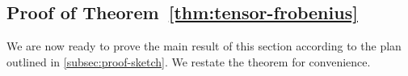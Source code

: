 \documentclass[aos]{imsart}
\theoremstyle{definition}
\numberwithin{equation}{section}
\DeclareMathOperator{\op}{op}
\DeclarePairedDelimiter{\abs}{\lvert}{\rvert}
\DeclarePairedDelimiter{\norm}{\lVert}{\rVert}
\def\dmax{d_{\max}}
\begin{document}

\subsection{Proof of Theorem~\ref{thm:tensor-frobenius}}
We are now ready to prove the main result of this section according to the plan outlined in \cref{subsec:proof-sketch}.
We restate the theorem for convenience.
\end{document}
